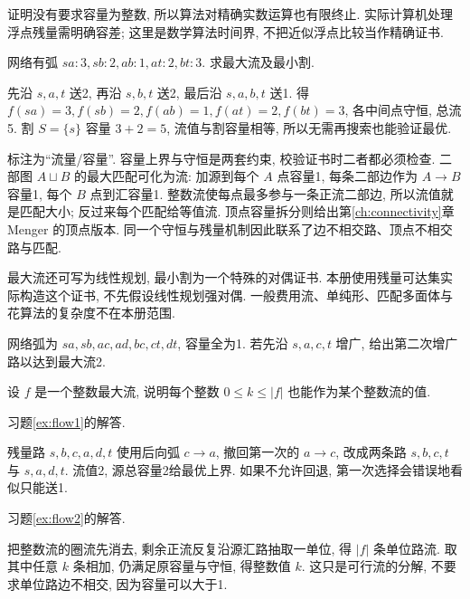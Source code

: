 证明没有要求容量为整数, 所以算法对精确实数运算也有限终止. 实际计算机处理浮点残量需明确容差; 这里是数学算法时间界, 不把近似浮点比较当作精确证书.
\begin{example}
网络有弧 $sa:3,sb:2,ab:1,at:2,bt:3$. 求最大流及最小割.
\end{example}
\begin{solution}
先沿 $s,a,t$ 送2, 再沿 $s,b,t$ 送2, 最后沿 $s,a,b,t$ 送1. 得 $f(sa)=3,f(sb)=2,f(ab)=1,f(at)=2,f(bt)=3$, 各中间点守恒, 总流5. 割 $S=\{s\}$ 容量 $3+2=5$, 流值与割容量相等, 所以无需再搜索也能验证最优.
\end{solution}
\begin{center}
\end{center}
标注为“流量/容量”. 容量上界与守恒是两套约束, 校验证书时二者都必须检查.
二部图 $A\sqcup B$ 的最大匹配可化为流: 加源到每个 $A$ 点容量1, 每条二部边作为 $A\to B$ 容量1, 每个 $B$ 点到汇容量1. 整数流使每点最多参与一条正流二部边, 所以流值就是匹配大小; 反过来每个匹配给等值流. 顶点容量拆分则给出第\ref{ch:connectivity}章 Menger 的顶点版本. 同一个守恒与残量机制因此联系了边不相交路、顶点不相交路与匹配.

最大流还可写为线性规划, 最小割为一个特殊的对偶证书. 本册使用残量可达集实际构造这个证书, 不先假设线性规划强对偶. 一般费用流、单纯形、匹配多面体与花算法的复杂度不在本册范围.
\begin{exercise}\label{ex:flow1}
网络弧为 $sa,sb,ac,ad,bc,ct,dt$, 容量全为1. 若先沿 $s,a,c,t$ 增广, 给出第二次增广路以达到最大流2.
\end{exercise}
\begin{exercise}\label{ex:flow2}
设 $f$ 是一个整数最大流, 说明每个整数 $0\le k\le |f|$ 也能作为某个整数流的值.
\end{exercise}
习题\ref{ex:flow1}的解答.
\begin{solution}
残量路 $s,b,c,a,d,t$ 使用后向弧 $c\to a$, 撤回第一次的 $a\to c$, 改成两条路 $s,b,c,t$ 与 $s,a,d,t$. 流值2, 源总容量2给最优上界. 如果不允许回退, 第一次选择会错误地看似只能送1.
\end{solution}
习题\ref{ex:flow2}的解答.
\begin{solution}
把整数流的圈流先消去, 剩余正流反复沿源汇路抽取一单位, 得 $|f|$ 条单位路流. 取其中任意 $k$ 条相加, 仍满足原容量与守恒, 得整数值 $k$. 这只是可行流的分解, 不要求单位路边不相交, 因为容量可以大于1.
\end{solution}
